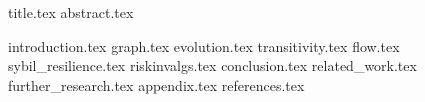 \documentclass[11pt]{llncs}
\begin{document}
{title.tex}
\thispagestyle{plain}
{abstract.tex}

{introduction.tex}
{graph.tex}
{evolution.tex}
{transitivity.tex}
{flow.tex}
{sybil_resilience.tex}
{riskinvalgs.tex}
{conclusion.tex}
{related_work.tex}
{further_research.tex}
{appendix.tex}
{references.tex}
\end{document}
